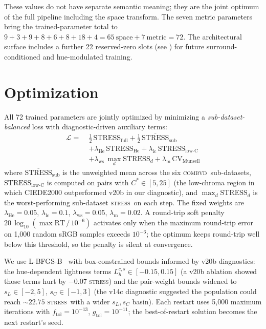 \documentclass[11pt, twocolumn]{article}
\newcommand{\stress}{\textsc{stress}}
\newcommand{\combvd}{\textsc{combvd}}
\begin{document}
These values do not have separate semantic meaning; they are the
joint optimum of the full pipeline including the space transform.
The seven metric parameters bring the trained-parameter total to
$9+3+9+8+6+8+18+4 = 65~\text{space} + 7~\text{metric} = 72$.
The architectural surface includes a further 22 reserved-zero slots
(see ) for future surround-conditioned and
hue-modulated training.


\section{Optimization}
\label{sec:optimization}

All 72 trained parameters are jointly optimized by minimizing a
\emph{sub-dataset-balanced} loss with diagnostic-driven auxiliary
terms:
\begin{equation}
\begin{split}
  \mathcal{L} =\;& \tfrac{1}{2}\,\mathrm{STRESS}_\mathrm{full}
    + \tfrac{1}{2}\,\overline{\mathrm{STRESS}}_\mathrm{sub} \\
   &+ \lambda_\mathrm{He}\,\mathrm{STRESS}_\mathrm{He}
    + \lambda_\mathrm{lc}\,\mathrm{STRESS}_\mathrm{low\text{-}C} \\
   &+ \lambda_\mathrm{ws}\,\max_d \mathrm{STRESS}_d
    + \lambda_\mathrm{m}\,\mathrm{CV}_\mathrm{Munsell}
\end{split}
  \label{eq:loss}
\end{equation}
where $\overline{\mathrm{STRESS}}_\mathrm{sub}$ is the unweighted
mean across the six \combvd\ sub-datasets,
$\mathrm{STRESS}_\mathrm{low\text{-}C}$ is computed on pairs with
$C^*\!\in[5,25]$ (the low-chroma region in which CIEDE2000 outperformed
v20b in our diagnostic), and $\max_d \mathrm{STRESS}_d$ is the
worst-performing sub-dataset \stress\ on each step. The fixed
weights are $\lambda_\mathrm{He}=0.05$, $\lambda_\mathrm{lc}=0.1$,
$\lambda_\mathrm{ws}=0.05$, $\lambda_\mathrm{m}=0.02$.
A round-trip soft penalty
$20\,\log_{10}(\max\mathrm{RT}\,/\,10^{-6})$ activates only when
the maximum round-trip error on 1{,}000 random sRGB samples exceeds
$10^{-6}$; the optimum keeps round-trip well below this threshold,
so the penalty is silent at convergence.

We use L-BFGS-B~\cite{byrd1995} with box-constrained bounds
informed by v20b diagnostics: the hue-dependent lightness terms
$L_h^{c,s}\!\in\![-0.15,0.15]$ (a v20b ablation showed those terms
hurt by $-0.07$ \stress) and the pair-weight bounds widened to
$s_L\!\in\![-2,5]$, $s_C\!\in\![-1,3]$ (the v14c diagnostic suggested
the population could reach $\sim\!22.75$ \stress\ with a wider
$s_L,s_C$ basin). Each restart uses 5{,}000 maximum iterations
with $f_\mathrm{tol}\!=\!10^{-13}$, $g_\mathrm{tol}\!=\!10^{-11}$;
the best-of-restart solution becomes the next restart's seed.
\end{document}
